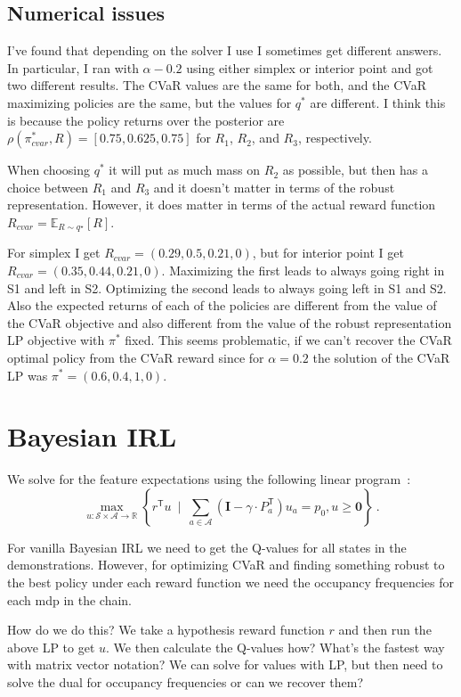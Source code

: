 \documentclass{article}
\newcommand{\tr}{^\mathsf{T}}
\newcommand{\Ex}{\mathbb{E}}
\newcommand{\zero}{\mathbf{0}}
\newcommand{\eye}{\mathbf{I}}
\newcommand{\states}{\mathcal{S}}
\newcommand{\actions}{\mathcal{A}}
\newcommand{\Real}{\mathbb{R}}
\newcommand{\opt}{^{\star}}
\begin{document}
\subsection{Numerical issues}
I've found that depending on the solver I use I sometimes get different answers. In particular, I ran with $\alpha - 0.2$ using either simplex or interior point and got two different results. The CVaR values are the same for both, and the CVaR maximizing policies are the same, but the values for $q^*$ are different. I think this is because the policy returns over the posterior are $\rho(\pi^*_{cvar},R) = [0.75 , 0.625, 0.75 ]$ for $R_1$, $R_2$, and $R_3$, respectively.

When choosing $q^*$ it will put as much mass on $R_2$ as possible, but then has a choice between $R_1$ and $R_3$ and it doesn't matter in terms of the robust representation. However, it does matter in terms of the actual reward function $R_{cvar} = \Ex_{R \sim q\opt}[R]$.

For simplex I get $R_{cvar} = (0.29, 0.5, 0.21, 0)$, but for interior point I get $R_{cvar} = (0.35, 0.44, 0.21, 0)$. Maximizing the first leads to always going right in S1 and left in S2. Optimizing the second leads to always going left in S1 and S2. Also the expected returns of each of the policies are different from the value of the CVaR objective and also different from the value of the robust representation LP objective with $\pi^*$ fixed. This seems problematic, if we can't recover the CVaR optimal policy from the CVaR reward since for $\alpha=0.2$ the solution of the CVaR LP was $\pi^* = (0.6, 0.4, 1, 0)$.
 
 
\section{Bayesian IRL}

We solve for the feature expectations using the following linear program~\cite{Puterman2005}:
	\[\max_{u:\states\times\actions\to\Real} \left\{ r\tr u ~\mid~ \sum_{a\in\mathcal{A}} (\eye - \gamma\cdot P_a\tr) u_a = p_0, u \ge \zero \right\}~. \]
	
For vanilla Bayesian IRL we need to get the Q-values for all states in the demonstrations. However, for optimizing CVaR and finding something robust to the best policy under each reward function we need the occupancy frequencies for each mdp in the chain. 

How do we do this? We take a hypothesis reward function $r$ and then run the above LP to get $u$. We then calculate the Q-values how? What's the fastest way with matrix vector notation? We can solve for values with LP, but then need to solve the dual for occupancy frequencies or can we recover them?
\end{document}
